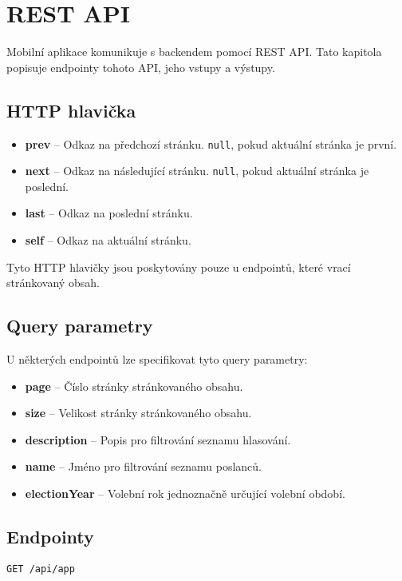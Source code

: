 \section{REST API}
\label{sec:rest}

Mobilní aplikace komunikuje s backendem pomocí REST API. Tato kapitola popisuje endpointy tohoto API, jeho vstupy a výstupy.

\subsection*{HTTP hlavička}

\begin{itemize}
	\item \textbf{prev} -- Odkaz na předchozí stránku. \lstinline|null|, pokud aktuální stránka je první.
	\item \textbf{next} -- Odkaz na následující stránku. \lstinline|null|, pokud aktuální stránka je poslední.
	\item \textbf{last} -- Odkaz na poslední stránku.
	\item \textbf{self} -- Odkaz na aktuální stránku.
\end{itemize}

\noindent Tyto HTTP hlavičky jsou poskytovány pouze u endpointů, které vrací stránkovaný obsah.

\subsection*{Query parametry}
U některých endpointů lze specifikovat tyto query parametry:

\begin{itemize}
	\item \textbf{page} -- Číslo stránky stránkovaného obsahu.
	\item \textbf{size} -- Velikost stránky stránkovaného obsahu.
	\item \textbf{description} -- Popis pro filtrování seznamu hlasování.
	\item \textbf{name} -- Jméno pro filtrování seznamu poslanců.
	\item \textbf{electionYear} -- Volební rok jednoznačně určující volební období.
\end{itemize}

\subsection*{Endpointy}

\begin{lstlisting}[caption={HTTP dotaz pro stav aplikace}, label={lst:endpoint-app}] 
GET /api/app
\end{lstlisting}

